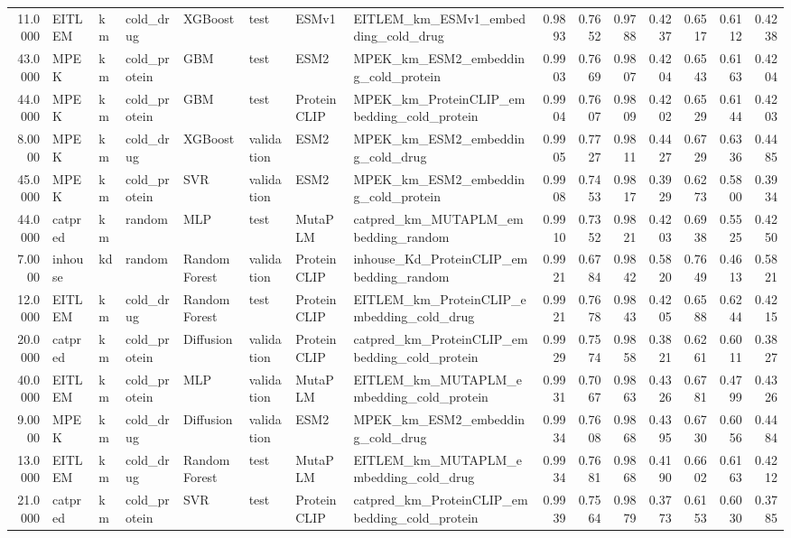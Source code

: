 \begin{tabular}{rlllllllrrrrrrr}
11.0000 & EITLEM & km & cold_drug & XGBoost & test & ESMv1 & EITLEM_km_ESMv1_embedding_cold_drug & 0.9893 & 0.7652 & 0.9788 & 0.4237 & 0.6517 & 0.6112 & 0.4238 \\
43.0000 & MPEK & km & cold_protein & GBM & test & ESM2 & MPEK_km_ESM2_embedding_cold_protein & 0.9903 & 0.7669 & 0.9807 & 0.4204 & 0.6543 & 0.6163 & 0.4204 \\
44.0000 & MPEK & km & cold_protein & GBM & test & ProteinCLIP & MPEK_km_ProteinCLIP_embedding_cold_protein & 0.9904 & 0.7607 & 0.9809 & 0.4202 & 0.6529 & 0.6144 & 0.4203 \\
8.0000 & MPEK & km & cold_drug & XGBoost & validation & ESM2 & MPEK_km_ESM2_embedding_cold_drug & 0.9905 & 0.7727 & 0.9811 & 0.4427 & 0.6729 & 0.6336 & 0.4485 \\
45.0000 & MPEK & km & cold_protein & SVR & validation & ESM2 & MPEK_km_ESM2_embedding_cold_protein & 0.9908 & 0.7453 & 0.9817 & 0.3929 & 0.6273 & 0.5800 & 0.3934 \\
44.0000 & catpred & km & random & MLP & test & MutaPLM & catpred_km_MUTAPLM_embedding_random & 0.9910 & 0.7352 & 0.9821 & 0.4203 & 0.6938 & 0.5525 & 0.4250 \\
7.0000 & inhouse & kd & random & Random Forest & validation & ProteinCLIP & inhouse_Kd_ProteinCLIP_embedding_random & 0.9921 & 0.6784 & 0.9842 & 0.5820 & 0.7649 & 0.4613 & 0.5821 \\
12.0000 & EITLEM & km & cold_drug & Random Forest & test & ProteinCLIP & EITLEM_km_ProteinCLIP_embedding_cold_drug & 0.9921 & 0.7678 & 0.9843 & 0.4205 & 0.6588 & 0.6244 & 0.4215 \\
20.0000 & catpred & km & cold_protein & Diffusion & validation & ProteinCLIP & catpred_km_ProteinCLIP_embedding_cold_protein & 0.9929 & 0.7574 & 0.9858 & 0.3821 & 0.6261 & 0.6011 & 0.3827 \\
40.0000 & EITLEM & km & cold_protein & MLP & validation & MutaPLM & EITLEM_km_MUTAPLM_embedding_cold_protein & 0.9931 & 0.7067 & 0.9863 & 0.4326 & 0.6781 & 0.4799 & 0.4326 \\
9.0000 & MPEK & km & cold_drug & Diffusion & validation & ESM2 & MPEK_km_ESM2_embedding_cold_drug & 0.9934 & 0.7608 & 0.9868 & 0.4395 & 0.6730 & 0.6056 & 0.4484 \\
13.0000 & EITLEM & km & cold_drug & Random Forest & test & MutaPLM & EITLEM_km_MUTAPLM_embedding_cold_drug & 0.9934 & 0.7681 & 0.9868 & 0.4190 & 0.6602 & 0.6163 & 0.4212 \\
21.0000 & catpred & km & cold_protein & SVR & test & ProteinCLIP & catpred_km_ProteinCLIP_embedding_cold_protein & 0.9939 & 0.7564 & 0.9879 & 0.3773 & 0.6153 & 0.6030 & 0.3785 \\

\end{tabular}
